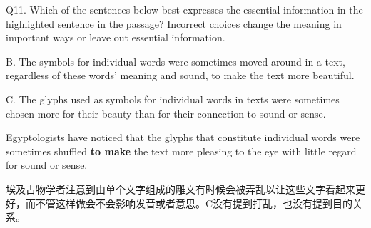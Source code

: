 \begin{blk}
    \begin{qst}
        Q11. Which of the sentences below best expresses the essential information in the highlighted sentence in the passage? Incorrect choices change the meaning in important ways or leave out essential information.
    \end{qst}

    \begin{chc}
        B. The symbols for individual words were sometimes moved around in a text, regardless of these words’ meaning and sound, to make the text more beautiful.

        C. The glyphs used as symbols for individual words in texts were sometimes chosen more for their beauty than for their connection to sound or sense.
    \end{chc}

    \begin{psgq}
        Egyptologists have noticed that the glyphs that constitute individual words were sometimes shuffled \textbf{to make} the text more pleasing to the eye with little regard for sound or sense.
    \end{psgq}

    \begin{nlz}
        埃及古物学者注意到由单个文字组成的雕文有时候会被弄乱以让这些文字看起来更好，而不管这样做会不会影响发音或者意思。C没有提到打乱，也没有提到目的关系。
    \end{nlz}
\end{blk}

\newpage
